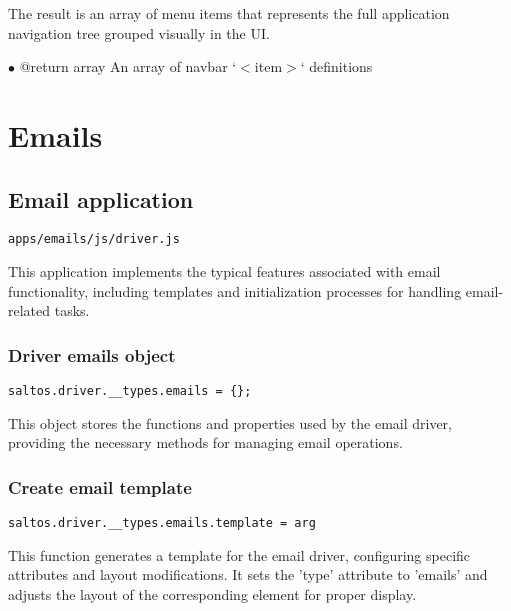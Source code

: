 \documentclass[a4paper]{article}
\begin{document}
The result is an array of menu items that represents the full application
navigation tree grouped visually in the UI.

\begin{compactitem}
\item[\color{myblue}$\bullet$] @return array An array of navbar `$<$item$>$` definitions
\end{compactitem}


\hypertarget{toc62}{}
\section{Emails}

\hypertarget{toc63}{}
\subsection{Email application}

\begin{lstlisting}
apps/emails/js/driver.js
\end{lstlisting}

This application implements the typical features associated with email functionality,
including templates and initialization processes for handling email-related tasks.

\hypertarget{toc64}{}
\subsubsection{Driver emails object}

\begin{lstlisting}
saltos.driver.__types.emails = {};
\end{lstlisting}

This object stores the functions and properties used by the email driver,
providing the necessary methods for managing email operations.

\hypertarget{toc65}{}
\subsubsection{Create email template}

\begin{lstlisting}
saltos.driver.__types.emails.template = arg
\end{lstlisting}

This function generates a template for the email driver, configuring specific
attributes and layout modifications. It sets the 'type' attribute to 'emails'
and adjusts the layout of the corresponding element for proper display.
\end{document}
